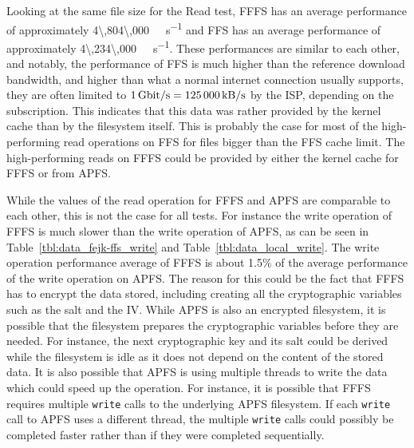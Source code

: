 Looking at the same file size for the Read test, \gls{FFFS} has an average performance of approximately \SI[per-mode = symbol]{4\,804\,000}{\kilo\byte\per\second} and \gls{FFS} has an average performance of approximately \SI[per-mode = symbol]{4\,234\,000}{\kilo\byte\per\second}. These performances are similar to each other, and notably, the performance of \gls{FFS} is much higher than the reference download bandwidth, and higher than what a normal internet connection usually supports, they are often limited to $\text{\SI[per-mode = symbol]{1}{\giga\bit\per\second}} = \text{\SI[per-mode = symbol]{125\,000}{\kilo\byte\per\second}}$ by the ISP, depending on the subscription. This indicates that this data was rather provided by the kernel cache than by the filesystem itself. This is probably the case for most of the \mbox{high-performing} read operations on \gls{FFS} for files bigger than the \gls{FFS} cache limit. The \mbox{high-performing} reads on \gls{FFFS} could be provided by either the kernel cache for \gls{FFFS} or from \gls{APFS}.

While the values of the read operation for \gls{FFFS} and \gls{APFS} are comparable to each other, this is not the case for all tests. For instance the write operation of \gls{FFFS} is much slower than the write operation of \gls{APFS}, as can be seen in Table~\ref{tbl:data_fejk-ffs_write} and Table~\ref{tbl:data_local_write}. The write operation performance average of \gls{FFFS} is about 1.5\% of the average performance of the write operation on \gls{APFS}. The reason for this could be the fact that \gls{FFFS} has to encrypt the data stored, including creating all the cryptographic variables such as the salt and the \gls{IV}. While \gls{APFS} is also an encrypted filesystem, it is possible that the filesystem prepares the cryptographic variables before they are needed. For instance, the next cryptographic key and its salt could be derived while the filesystem is idle as it does not depend on the content of the stored data. It is also possible that \gls{APFS} is using multiple threads to write the data which could speed up the operation. For instance, it is possible that \gls{FFFS} requires multiple \texttt{write} calls to the underlying \gls{APFS} filesystem. If each \texttt{write} call to \gls{APFS} uses a different thread, the multiple \texttt{write} calls could possibly be completed faster rather than if they were completed sequentially. 

